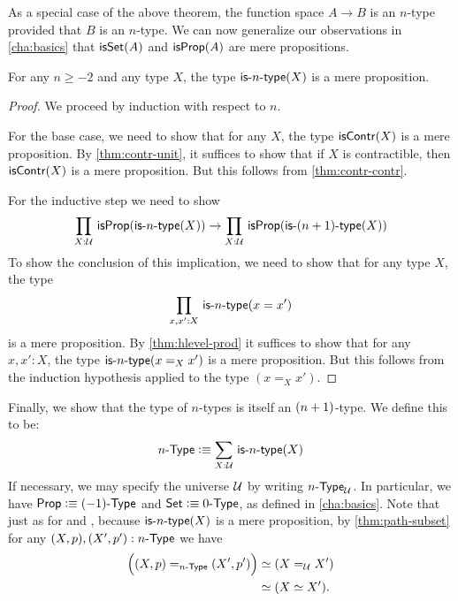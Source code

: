 As a special case of the above theorem, the function space $A \to B$ is an $n$-type provided that $B$ is an $n$-type.
We can now generalize our observations in \autoref{cha:basics} that $\isset(A)$ and $\isprop(A)$ are mere propositions.

\begin{thm}\label{thm:isaprop-isofhlevel}
 For any $n \geq -2$ and any type $X$, the type $\istype{n}(X)$ is a mere proposition.
\end{thm}
\begin{proof}
  We proceed by induction with respect to $n$.

 For the base case, we need to show that for any $X$, the type $\iscontr(X)$ is a mere proposition.
 By \autoref{thm:contr-unit}, it suffices to show that if $X$ is contractible, then $\iscontr(X)$ is a mere proposition.
 But this follows from \autoref{thm:contr-contr}.

For the inductive step we need to show
\[\prd{X : \type} \isprop (\istype{n}(X)) \to \prd{X : \type} \isprop (\istype{\nplusone}(X)) \]
To show the conclusion of this implication, we need to show that for any type $X$, the type
\[\prd{x, x' : X}\istype{n}(x = x')\]
is a mere proposition. By \autoref{thm:hlevel-prod} it suffices to show that for any $x, x' : X$, the type $\istype{n}(x =_X x')$ is a mere
proposition.
But this follows from the induction hypothesis applied to the type $(x =_X x')$.
\end{proof}

Finally, we show that the type of $n$-types is itself an $\nplusone$-type.
We define this to be:
\[\ntype{n} \defeq \sm{X : \type} \istype{n}(X) \]
If necessary, we may specify the universe $\UU$ by writing $\ntypeU{n}$.
In particular, we have $\prop \defeq \ntype{(-1)}$ and $\set \defeq \ntype{0}$, as defined in \autoref{cha:basics}.
Note that just as for \prop and \set, because $\istype{n}(X)$ is a mere proposition, by \autoref{thm:path-subset} for any $(X,p), (X',p'):\ntype{n}$ we have
\begin{align*}
  \Big(\id[\ntype{n}]{(X, p)}{(X', p')}\Big) &\simeq (\id[\type] X X')\\
  &\simeq (\eqv{X}{X'}).
\end{align*}

